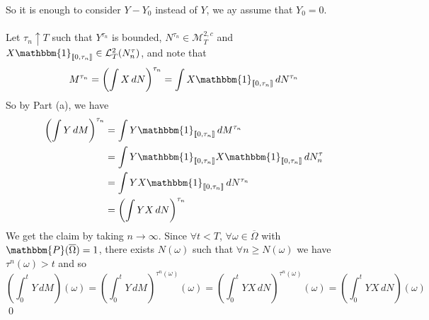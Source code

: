 \documentclass[12pt,a4paper]{article}
\renewenvironment{proof}
    {\begin{trivlist}\item[\hskip\labelsep\color{blue}\bfseries Proof:]}
    {\qed\end{trivlist}}
\begin{document}
\begin{proof}
$$    $$
    So it is enough to consider $Y-Y_0$ instead of $Y$, we ay assume that $Y_0=0$.\\
    \\
    Let $\tau_n\uparrow T$ such that $Y^{\tau_n}$ is bounded, $N^{\tau_n} \in\mathcal{M}^{2,c}_T$ and $X\mathbbm{1}_{\llbracket 0,\tau_n\rrbracket}\in \mathcal{L}^2_T(N^\tau_n)$, and note that 
    $$
    M^{\tau_n} = \left(\int X\,dN\right)^{\tau_n} = \int X\mathbbm{1}_{\llbracket 0,\tau_n\rrbracket} \,dN^{\tau_n}
    $$
    So by Part (a), we have
    \begin{align*}
        \left(\int Y\, dM\right)^{\tau_n} &= \int Y\mathbbm{1}_{\llbracket 0,\tau_n\rrbracket}\, dM^{\tau_n}\\
        &= \int Y\mathbbm{1}_{\llbracket 0,\tau_n\rrbracket} X\mathbbm{1}_{\llbracket 0,\tau_n\rrbracket}\,dN^\tau_n\\
        &= \int YX\mathbbm{1}_{\llbracket 0,\tau_n\rrbracket}\, dN^{\tau_n}\\
        &=\left(\int YX\, dN\right)^{\tau_n}
    \end{align*}
    We get the claim by taking $n\to\infty$. Since $\forall t<T$, $\forall \omega\in\overline \Omega$ with $\mathbbm{P}(\overline\Omega)=1$, there exists $N(\omega)$ such that $\forall n\ge N(\omega)$ we have $\tau^n(\omega)>t$ and so
    $$
    \left(\int_0^t Y\,dM\right)(\omega) = \left(\int_0^t Y\, dM\right)^{\tau^n(\omega)}(\omega) = \left(\int_0^t YX\, dN\right)^{\tau^n(\omega)}(\omega) = \left(\int_0^t YX\, dN\right)(\omega)
    $$
\end{proof}
\pagebreak
\end{document}
